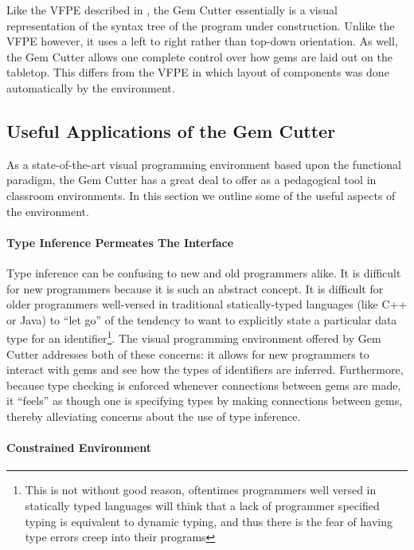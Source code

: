 Like the VFPE described in , the Gem Cutter essentially is a visual representation of the syntax tree of the program under construction.  Unlike the VFPE however, it uses a left to right rather than top-down orientation.  As well, the Gem Cutter allows one complete control over how gems are laid out on the tabletop.  This differs from the VFPE in which layout of components was done automatically by the environment.

\subsection{Useful Applications of the Gem Cutter}
\label{sec:gemCutterUsefulApps}

As a state-of-the-art visual programming environment based upon the functional paradigm, the Gem Cutter has a great deal to offer as a pedagogical tool in classroom environments.  In this section we outline some of the useful aspects of the environment.

\paragraph{Type Inference Permeates The Interface} 

Type inference can be confusing to new and old programmers alike.  It is difficult for new programmers because it is such an abstract concept.  It is difficult for older programmers well-versed in traditional statically-typed languages (like C++ or Java) to ``let go'' of the tendency to want to explicitly state a particular data type for an identifier\footnote{This is not without good reason, oftentimes programmers well versed in statically typed languages will think that a lack of programmer specified typing is equivalent to dynamic typing, and thus there is the fear of having type errors creep into their programs}.  The visual programming environment offered by Gem Cutter addresses both of these concerns: it allows for new programmers to interact with gems and see how the types of identifiers are inferred.  Furthermore, because type checking is enforced whenever connections between gems are made, it ``feels'' as though one is specifying types by making connections between gems, thereby alleviating concerns about the use of type inference.

\paragraph{Constrained Environment}

